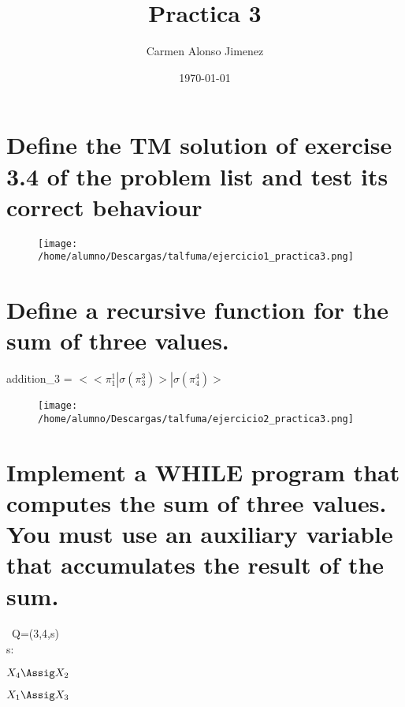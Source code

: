 \documentclass[11pt]{article}
\title{\textbf{Practica 3}}
\author{Carmen Alonso Jimenez}
\date{\today}
\begin{document}
\maketitle
\thispagestyle{plain}
\setlength{\parskip}{6pt}

\section{Define the TM solution of exercise 3.4 of the problem list and test its correct
behaviour}

\begin{figure}[htp]
\centering
\texttt{[image: /home/alumno/Descargas/talfuma/ejercicio1\_practica3.png]}
\caption{}
\end{figure}

\section{Define a recursive function for the sum of three values.}
\begin{center}
addition\_3 = $<<\pi^1_1|\sigma\left(\pi^3_3\right)>|\sigma\left(\pi^4_4\right)>$
\end{center}
\newpage
\begin{figure}[htp]
\centering
\texttt{[image: /home/alumno/Descargas/talfuma/ejercicio2\_practica3.png]}
\caption{}
\label{}
\end{figure}
\section{Implement  a  WHILE  program  that  computes  the  sum  of  three  values.   You
must use an auxiliary variable that accumulates the result of the sum.}

\begin{whilecode}[H]

\ Q=(3,4,s)
\\ s:

 $X_4 \Assig X_2$
 
 $X_1 \Assig X_3$
  
 
 
 \end{whilecode}
\end{document}
